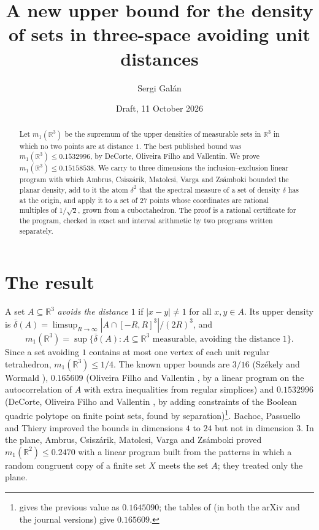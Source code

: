 \documentclass[11pt,a4paper]{amsart}
\title{A new upper bound for the density of sets in three-space avoiding unit distances}
\author{Sergi Gal\'an}
\date{Draft, 11 October 2026}
\theoremstyle{remark}
\newcommand{\R}{\mathbb{R}}
\newcommand{\NPTS}{27}
\newcommand{\MONE}{0.15158538}
\begin{document}
\begin{abstract}
Let $m_1(\R^3)$ be the supremum of the upper densities of measurable sets in $\R^3$ in which no two points are at
distance $1$. The best published bound was $m_1(\R^3)\le0.1532996$, by DeCorte, Oliveira Filho and Vallentin. We
prove $m_1(\R^3)\le\MONE$. We carry to three dimensions the inclusion--exclusion linear program with which Ambrus,
Csisz\'arik, Matolcsi, Varga and Zs\'amboki bounded the planar density, add to it the atom $\delta^2$ that the spectral
measure of a set of density $\delta$ has at the origin, and apply it to a set of $\NPTS$ points whose coordinates are
rational multiples of $1/\sqrt2$, grown from a cuboctahedron. The proof is a rational certificate for the program,
checked in exact and interval arithmetic by two programs written separately.
\end{abstract}

\maketitle

\section{The result}

A set $A\subseteq\R^3$ \emph{avoids the distance $1$} if $|x-y|\ne1$ for all $x,y\in A$. Its upper density is
$\overline\delta(A)=\limsup_{R\to\infty}|A\cap[-R,R]^3|/(2R)^3$, and
\[
m_1(\R^3)=\sup\{\overline\delta(A):A\subseteq\R^3\text{ measurable, avoiding the distance }1\}.
\]
Since a set avoiding $1$ contains at most one vertex of each unit regular tetrahedron, $m_1(\R^3)\le1/4$. The known
upper bounds are $3/16$ (Sz\'ekely and Wormald \cite{SW}), $0.165609$ (Oliveira Filho and Vallentin \cite{OFV}, by a
linear program on the autocorrelation of $A$ with extra inequalities from regular simplices) and $0.1532996$ (DeCorte,
Oliveira Filho and Vallentin \cite[Table~2]{DOV}, by adding constraints of the Boolean quadric polytope on finite point
sets, found by separation)\footnote{\cite[Table~2]{DOV} gives the previous value as $0.1645090$; the tables of
\cite{OFV} (in both the arXiv and the journal versions) give $0.165609$.}. Bachoc, Passuello and Thiery \cite{BPT}
improved the bounds in dimensions $4$ to $24$ but not in dimension $3$. In the plane, Ambrus, Csisz\'arik, Matolcsi,
Varga and Zs\'amboki \cite{ACMVZ} proved $m_1(\R^2)\le0.2470$ with a linear program built from the patterns in which a
random congruent copy of a finite set $X$ meets the set $A$; they treated only the plane.
\end{document}
